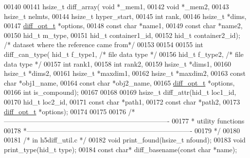 \begin{DoxyCode}
00140 
00141 hsize\_t diff\_array( \textcolor{keywordtype}{void} *\_mem1,
00142                     \textcolor{keywordtype}{void} *\_mem2,
00143                     hsize\_t nelmts,
00144                     hsize\_t hyper\_start,
00145                     \textcolor{keywordtype}{int} rank,
00146                     hsize\_t *dims,
00147                     \hyperlink{structdiff__opt__t}{diff\_opt\_t} *options,
00148                     \textcolor{keyword}{const} \textcolor{keywordtype}{char} *name1,
00149                     \textcolor{keyword}{const} \textcolor{keywordtype}{char} *name2,
00150                     hid\_t m\_type,
00151                     hid\_t container1\_id,
00152                     hid\_t container2\_id); \textcolor{comment}{/* dataset where the reference came from*/}
00153 
00154 
00155 \textcolor{keywordtype}{int} diff\_can\_type( hid\_t       f\_type1, \textcolor{comment}{/* file data type */}
00156                    hid\_t       f\_type2, \textcolor{comment}{/* file data type */}
00157                    \textcolor{keywordtype}{int}         rank1,
00158                    \textcolor{keywordtype}{int}         rank2,
00159                    hsize\_t     *dims1,
00160                    hsize\_t     *dims2,
00161                    hsize\_t     *maxdim1,
00162                    hsize\_t     *maxdim2,
00163                    \textcolor{keyword}{const} \textcolor{keywordtype}{char}  *obj1\_name,
00164                    \textcolor{keyword}{const} \textcolor{keywordtype}{char}  *obj2\_name,
00165                    \hyperlink{structdiff__opt__t}{diff\_opt\_t}  *options,
00166                    \textcolor{keywordtype}{int}         is\_compound);
00167 
00168 
00169 hsize\_t diff\_attr(hid\_t loc1\_id,
00170                   hid\_t loc2\_id,
00171                   \textcolor{keyword}{const} \textcolor{keywordtype}{char} *path1,
00172                   \textcolor{keyword}{const} \textcolor{keywordtype}{char} *path2,
00173                   \hyperlink{structdiff__opt__t}{diff\_opt\_t} *options);
00174 
00175 
00176 \textcolor{comment}{/*-------------------------------------------------------------------------}
00177 \textcolor{comment}{ * utility functions}
00178 \textcolor{comment}{ *-------------------------------------------------------------------------}
00179 \textcolor{comment}{ */}
00180 
00181 \textcolor{comment}{/* in h5diff\_util.c */}
00182 \textcolor{keywordtype}{void}        print\_found(hsize\_t nfound);
00183 \textcolor{keywordtype}{void}        print\_type(hid\_t type);
00184 \textcolor{keyword}{const} \textcolor{keywordtype}{char}* diff\_basename(\textcolor{keyword}{const} \textcolor{keywordtype}{char} *name);

\end{DoxyCode}

